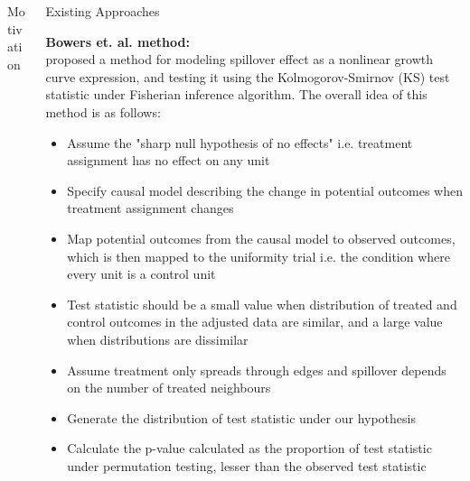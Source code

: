 \documentclass[final]{beamer}
\newlength{\onecolwid}
\newlength{\onecolwidd}
\begin{document}
\begin{frame}[t]
\begin{columns}[t]
\begin{column}{\onecolwidd}
\begin{block}{Motivation}
	\end{block}
	

\end{column}		
	\begin{column}{\onecolwidd}
	
	\begin{block}{Existing Approaches}
		\begin{rmfamily}
	
	{\Large \textbf{Bowers et. al. method:}}\\
	\citealt{bowers2012reasoning} proposed a method for modeling spillover effect as a nonlinear growth curve expression, and testing it using the  Kolmogorov-Smirnov (KS) test statistic under Fisherian inference algorithm. The overall idea of this method is as follows:

	\begin{itemize}
	
	\item Assume the "sharp null hypothesis of no effects" i.e. treatment assignment has no effect on any unit
	\vspace*{.1in}
	\item Specify causal model describing the change in potential outcomes when treatment assignment changes
	\vspace*{.1in}
	\item  Map potential outcomes from the causal model to observed outcomes, which is then mapped to the uniformity trial i.e. the condition where every unit is a control unit
	\vspace*{.1in}	
	\item Test statistic should be a small value when distribution of treated and control outcomes in the adjusted data are similar, and a large value when distributions are dissimilar
	\vspace*{.1in}
	\item Assume treatment only spreads through edges and spillover depends on the number of treated neighbours
	\vspace*{.1in}
	\item Generate the distribution of test statistic under our hypothesis
	\vspace*{.1in}
	\item Calculate the p-value calculated as the proportion of test statistic under permutation testing, lesser than the observed test statistic
	\vspace*{.1in}	
	\end{itemize}

\hspace{2cm}


\end{rmfamily}
\end{block}
\end{column}
\end{columns}
\end{frame}
\end{document}
